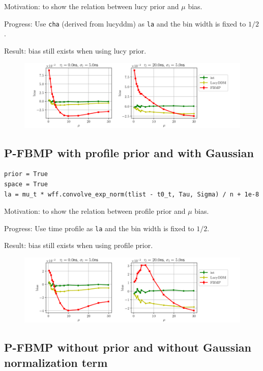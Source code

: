 \documentclass[notitlepage]{article}
\begin{document}
Motivation: to show the relation between lucy prior and $\mu$ bias. 

Progress: Use \texttt{cha} (derived from lucyddm) as \texttt{la} and the bin width is fixed to $1/2$. 

Result: bias still exists when using lucy prior. 

\begin{figure}[H]
    \includegraphics[width=\textwidth]{vs-biasmu-lucyprior.png}
\end{figure}

\subsection{P-FBMP \textbf{with} profile prior and \textbf{with} Gaussian}

\begin{lstlisting}
prior = True
space = True
la = mu_t * wff.convolve_exp_norm(tlist - t0_t, Tau, Sigma) / n + 1e-8
\end{lstlisting}

Motivation: to show the relation between profile prior and $\mu$ bias.  

Progress: Use time profile as \texttt{la} and the bin width is fixed to $1/2$. 

Result: bias still exists when using profile prior. 

\begin{figure}[H]
    \includegraphics[width=\textwidth]{vs-biasmu-profileprior.png}
\end{figure}

\subsection{P-FBMP \textbf{without} prior and \textbf{without} Gaussian normalization term}
\end{document}
